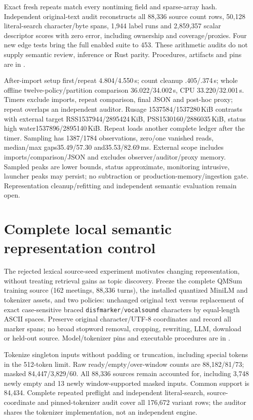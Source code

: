 \documentclass[11pt]{article}
\begin{document}
Exact fresh repeats match every nontiming field and sparse-array hash.
Independent original-text audit reconstructs all 88,336 source count rows,
50,128 literal-search character/byte spans, 1,944 label runs and 2,859,357 scalar
descriptor scores with zero error, including ownership and coverage/proxies.
Four new edge tests bring the full enabled suite to 453. These arithmetic audits
do not supply semantic review, inference or Rust parity. Procedures, artifacts
and pins are in .

After-import setup first/repeat 4.804/4.550\,s; count cleanup .405/.374\,s;
whole offline twelve-policy/partition comparison 36.022/34.002\,s, CPU
33.220/32.001\,s. Timers exclude imports, repeat comparison, final JSON and
post-hoc proxy; repeat overlaps an independent auditor. Rusage
1537584/1537280\,KiB contrasts with external target RSS1537944/2895424\,KiB,
PSS1530160/2886035\,KiB, status high water1537896/2895140\,KiB. Repeat loads
another complete ledger after the timer. Sampling has 1387/1784 observations,
zero/one vanished reads, median/max gaps35.49/57.30 and35.53/82.69\,ms.
External scope includes imports/comparison/JSON and excludes observer/auditor/proxy
memory. Sampled peaks are lower bounds, status approximate, monitoring intrusive,
launcher peaks may persist; no subtraction or production-memory/ingestion gate.
Representation cleanup/refitting and independent semantic evaluation remain open.

\section{Complete local semantic representation control}
The rejected lexical source-seed experiment motivates changing representation,
without treating retrieval gains as topic discovery. Freeze the complete QMSum
training source (162 meetings, 88,336 turns), the installed quantized MiniLM and
tokenizer assets, and two policies: unchanged original text versus replacement
of exact case-sensitive braced \texttt{disfmarker}/\texttt{vocalsound} characters
by equal-length ASCII spaces. Preserve original character/UTF-8 coordinates and
record all marker spans; no broad stopword removal, cropping, rewriting, LLM,
download or held-out source. Model/tokenizer pins and executable procedures are
in .

Tokenize singleton inputs without padding or truncation, including special
tokens in the 512-token limit. Raw ready/empty/over-window counts are
88,182/81/73; masked 84,447/3,829/60. All 88,336 sources remain accounted for,
including 3,748 newly empty and 13 newly window-supported masked inputs. Common
support is 84,434. Complete repeated preflight and independent literal-search,
source-coordinate and pinned-tokenizer audit cover all 176,672 variant rows;
the auditor shares the tokenizer implementation, not an independent engine.
\end{document}
